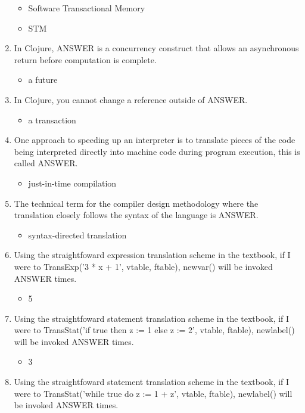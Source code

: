 \documentclass{exam}
\begin{document}
\begin{enumerate}
\begin{itemize}
\item Software Transactional Memory
\item STM
\end{itemize}
\item In Clojure, ANSWER is a concurrency construct that allows an asynchronous return before computation is complete.
\begin{itemize}
\item a future
\end{itemize}
\item In Clojure, you cannot change a reference outside of ANSWER.
\begin{itemize}
\item a transaction
\end{itemize}
\item One approach to speeding up an interpreter is to translate pieces of the code being interpreted directly into machine code during program execution, this is called ANSWER.
\begin{itemize}
\item just-in-time compilation
\end{itemize}
\item The technical term for the compiler design methodology where the translation closely follows the syntax of the language is ANSWER.
\begin{itemize}
\item syntax-directed translation
\end{itemize}
\item Using the straightfoward expression translation scheme in the textbook, if I were to TransExp('3 * x + 1', vtable, ftable), newvar() will be invoked ANSWER times.
\begin{itemize}
\item 5
\end{itemize}
\item Using the straightfoward statement translation scheme in the textbook, if I were to TransStat('if true then z := 1 else z := 2', vtable, ftable), newlabel() will be invoked ANSWER times.
\begin{itemize}
\item 3
\end{itemize}
\item Using the straightfoward statement translation scheme in the textbook, if I were to TransStat('while true do z := 1 + z', vtable, ftable), newlabel() will be invoked ANSWER times.
\begin{itemize}

\end{itemize}
\end{enumerate}
\end{document}
